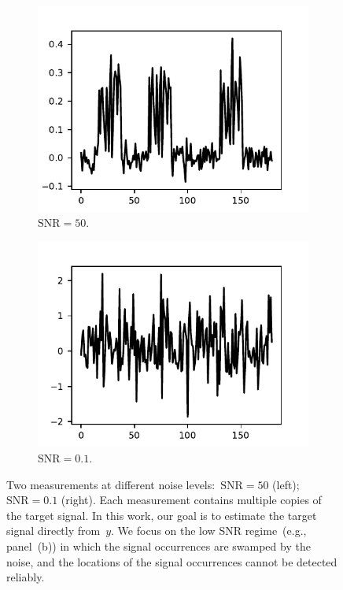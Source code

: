 \documentclass{article}
\begin{document}
\begin{figure}[!tb]
	\begin{subfigure}[ht]{0.49\columnwidth}
		\centering
		\includegraphics[width=\columnwidth]{figures/y_SNR50.pdf}
		\caption{$\text{SNR} = 50$.}
	\end{subfigure}
	\hfill
	\begin{subfigure}[ht]{0.49\columnwidth}
		\centering
		\includegraphics[width=\columnwidth]{figures/y_SNR01.pdf}
		\caption{$\text{SNR} = 0.1$.}
	\end{subfigure}
	\caption{Two measurements at different noise levels:~\mbox{$\text{SNR} = 50$} (left);~\mbox{$\text{SNR} = 0.1$} (right). Each measurement contains multiple copies of the target signal. In this work, our goal is to estimate the target signal directly from~$y$. We focus on the low SNR regime~(e.g., panel~(b)) in which the signal occurrences are swamped by the noise, and the locations of the signal occurrences cannot be detected reliably.}
\label{fig:measurements}
\end{figure}
\end{document}
